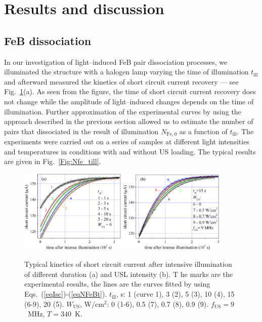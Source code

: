 \documentclass[%
 aip,jap,
 amsmath,amssymb,
 reprint,%
]{revtex4-1}
\begin{document}
\section{\label{sec:Rez}Results and discussion}
\subsection{\label{sec:FeBdis}FeB dissociation}


In our investigation of light--induced FeB pair dissociation processes,
we illuminated the structure with a halogen lamp varying the time of illumination
$t_\mathrm{ill}$ and afterward measured the
kinetics of short circuit current recovery –-- see Fig.~\ref{Fig:IscKin}(a).
As seen from the figure, the time of short circuit current recovery does not change while the amplitude of light--induced changes depends on the time of illumination.
Further approximation of the experimental curves by using the approach described in the previous section allowed us to estimate the number of pairs that dissociated in the result of illumination $N_\mathrm{Fe,0}$ as a function of $t_\mathrm{ill}$.
The experiments were carried out on a series of samples
at different light intensities and temperatures in conditions with  and without US loading.
The typical results are given in Fig.~\ref{Fig:Nfe_till}.

\begin{figure}
\includegraphics[width=0.45\textwidth]{Fig3a}%
\includegraphics[width=0.45\textwidth]{Fig3b}%
\caption{\label{Fig:IscKin}
Typical kinetics of short circuit current after intensive illumination of different duration (a) and USL intensity (b). T
he marks are the experimental results,
the lines are the curves fitted by using Eqs.~(\ref{eqIsc})-(\ref{eqNFeBt}).
$t_\mathrm{ill}$, s: 1 (curve 1), 3 (2), 5 (3), 10 (4), 15 (6-9), 20 (5).
$W_\mathrm{US}$, W/cm$^2$: 0 (1-6), 0.5 (7), 0.7 (8), 0.9 (9).
$f_\mathrm{US}=9$~MHz, $T=340$~K.
}
\end{figure}
\end{document}

